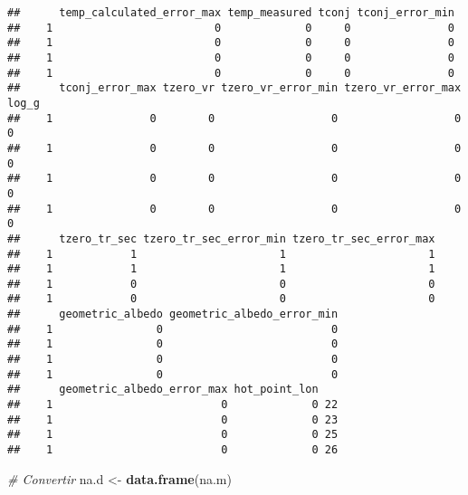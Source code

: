 \documentclass[]{article}
\newenvironment{Shaded}{\begin{snugshade}}{\end{snugshade}}
\newcommand{\KeywordTok}[1]{\textcolor[rgb]{0.13,0.29,0.53}{\textbf{{#1}}}}
\newcommand{\StringTok}[1]{\textcolor[rgb]{0.31,0.60,0.02}{{#1}}}
\newcommand{\CommentTok}[1]{\textcolor[rgb]{0.56,0.35,0.01}{\textit{{#1}}}}
\newcommand{\NormalTok}[1]{{#1}}
\begin{document}
\begin{verbatim}
##      temp_calculated_error_max temp_measured tconj tconj_error_min
##    1                         0             0     0               0
##    1                         0             0     0               0
##    1                         0             0     0               0
##    1                         0             0     0               0
##      tconj_error_max tzero_vr tzero_vr_error_min tzero_vr_error_max log_g
##    1               0        0                  0                  0     0
##    1               0        0                  0                  0     0
##    1               0        0                  0                  0     0
##    1               0        0                  0                  0     0
##      tzero_tr_sec tzero_tr_sec_error_min tzero_tr_sec_error_max
##    1            1                      1                      1
##    1            1                      1                      1
##    1            0                      0                      0
##    1            0                      0                      0
##      geometric_albedo geometric_albedo_error_min
##    1                0                          0
##    1                0                          0
##    1                0                          0
##    1                0                          0
##      geometric_albedo_error_max hot_point_lon   
##    1                          0             0 22
##    1                          0             0 23
##    1                          0             0 25
##    1                          0             0 26
\end{verbatim}

\begin{Shaded}
\begin{Highlighting}[]
\CommentTok{# Convertir}
\NormalTok{na.d <-}\StringTok{ }\KeywordTok{data.frame}\NormalTok{(na.m)}
\end{Highlighting}
\end{Shaded}
\end{document}
